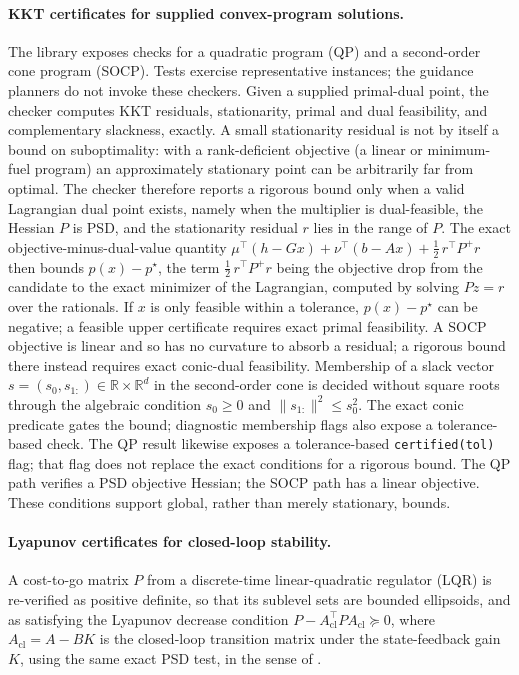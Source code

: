 \documentclass[11pt]{article}
\newcommand{\R}{\mathbb{R}}
\theoremstyle{plain}
\theoremstyle{remark}
\begin{document}
\paragraph{KKT certificates for supplied convex-program solutions.}
The library exposes checks for a quadratic program (QP) and a second-order
cone program (SOCP). Tests exercise representative instances; the guidance
planners do not invoke these checkers. Given a supplied primal-dual point,
the checker computes KKT residuals, stationarity, primal and dual
feasibility, and complementary slackness, exactly. A small stationarity residual
is not by itself a bound on suboptimality: with a rank-deficient objective (a
linear or minimum-fuel program) an approximately stationary point can be
arbitrarily far from optimal. The checker therefore reports a rigorous bound only
when a valid Lagrangian dual point exists, namely when the multiplier is
dual-feasible, the Hessian $P$ is PSD, and the stationarity residual $r$ lies in
the range of $P$. The exact objective-minus-dual-value quantity
$\mu^\top(h - Gx) + \nu^\top(b - Ax) + \tfrac12\, r^\top P^{+} r$ then bounds
$p(x) - p^\star$, the term $\tfrac12\, r^\top P^{+} r$ being the objective drop
from the candidate to the exact minimizer of the Lagrangian, computed by solving
$P z = r$ over the rationals. If $x$ is only feasible within a tolerance,
$p(x)-p^\star$ can be negative; a feasible upper certificate requires exact
primal feasibility. A SOCP objective is linear and so has no curvature
to absorb a residual; a rigorous bound there instead requires exact conic-dual
feasibility. Membership of a slack vector
$s = (s_0, s_{1:}) \in \R \times \R^d$ in the second-order cone is decided without
square roots through the algebraic condition $s_0 \ge 0$ and
$\lVert s_{1:}\rVert^2 \le s_0^2$. The exact conic predicate gates the bound;
diagnostic membership flags also expose a tolerance-based check.
The QP result likewise exposes a tolerance-based \texttt{certified(tol)} flag;
that flag does not replace the exact conditions for a rigorous bound. The QP path
verifies a PSD objective Hessian; the SOCP path has a linear objective.
These conditions support global, rather than merely stationary, bounds.

\paragraph{Lyapunov certificates for closed-loop stability.}
A cost-to-go matrix $P$ from a discrete-time linear-quadratic regulator (LQR) is
re-verified as positive definite, so that its sublevel sets are bounded
ellipsoids, and as satisfying the Lyapunov decrease condition
$P - A_{\mathrm{cl}}^\top P A_{\mathrm{cl}} \succeq 0$, where
$A_{\mathrm{cl}} = A - BK$ is the closed-loop transition matrix under the
state-feedback gain $K$, using the same exact PSD test, in the sense of
\cite{feron2013}.
\end{document}

